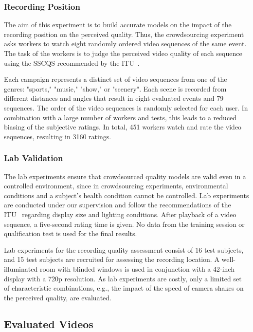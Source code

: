 \subsubsection{Recording Position}
The aim of this experiment is to build accurate models on the impact of the recording position on the perceived quality.
Thus, the crowdsourcing experiment asks workers to watch eight randomly ordered video sequences of the same event.
The task of the workers is to judge the perceived video quality of each sequence using the \ac{SSCQS} recommended by the \ac{ITU}~\cite{ITU-R2012}. 
 
Each campaign represents a distinct set of video sequences from one of the genres: "sports," "music," "show," or "scenery". 
Each scene is recorded from different distances and angles that result in eight evaluated events and 79 sequences. 
The order of the video sequences is randomly selected for each user.
In combination with a large number of workers and tests, this leads to a reduced biasing of the subjective ratings. 
In total, 451 workers watch and rate the video sequences, resulting in 3160 ratings. 
\subsubsection{Lab Validation}
The lab experiments ensure that crowdsourced quality models are valid even in a controlled environment, since in crowdsourcing experiments, environmental conditions and a subject's health condition cannot be controlled. 
Lab experiments are conducted under our supervision and follow the recommendations of the \ac{ITU}~\cite{ITU-R2012} regarding display size and lighting conditions.
After playback of a video sequence, a five-second rating time is given.
No data from the training session or qualification test is used for the final results. %

Lab experiments for the recording quality assessment consist of 16 test subjects, and 15 test subjects are recruited for assessing the recording location. 
A well-illuminated room with blinded windows is used in conjunction with a 42-inch display with a \ac{720p} resolution.
As lab experiments are costly, only a limited set of characteristic combinations, e.g., the impact of the speed of camera shakes on the perceived quality, are evaluated.
\subsection{Evaluated Videos}
\label{sec:420_approach_evaluated_videos}
